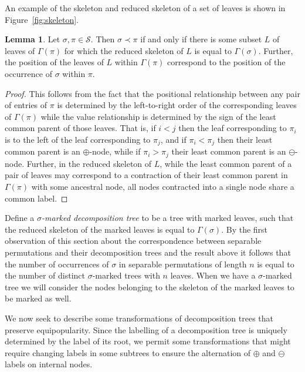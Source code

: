 \documentclass[10pt]{article}
\theoremstyle{definition}
\newtheorem{lemma}[theorem]{Lemma}
\numberwithin{equation}{section}
\numberwithin{figure}{section}
\begin{document}
An example of the skeleton and reduced skeleton of a set of leaves is shown in Figure~\ref{fig:skeleton}. 

\begin{lemma}
Let $\sigma, \pi \in \mathcal{S}$. Then $\sigma \prec \pi$ if and only if there is some subset $L$ of leaves of $\Gamma(\pi)$ for which the reduced skeleton of $L$ is equal to $\Gamma(\sigma)$. Further, the position of the leaves of $L$ within $\Gamma(\pi)$ correspond to the position of the occurrence of $\sigma$ within $\pi$. 
\end{lemma}

\begin{proof}
This follows from the fact that the positional relationship between any pair of entries of $\pi$ is determined by the left-to-right order of the corresponding leaves of $\Gamma(\pi)$ while the value relationship is determined by the sign of the least common parent of those leaves. That is, if $i < j$ then the leaf corresponding to $\pi_i$ is to the left of the leaf corresponding to $\pi_j$, and if $\pi_i < \pi_j$ then their least common parent is an $\oplus$-node, while if $\pi_i > \pi_j$ their least common parent is an $\ominus$-node. Further, in the reduced skeleton of $L$, while the least common parent of a pair of leaves may correspond to a contraction of their least common parent in $\Gamma(\pi)$ with some ancestral node, all nodes contracted into a single node share a common label.
\end{proof}

Define a \emph{$\sigma$-marked decomposition tree} to be a tree with marked leaves, such that the reduced skeleton of the marked leaves is equal to $\Gamma(\sigma)$. By the first observation of this section about the correspondence between separable permutations and their decomposition trees and the result above it follows that the number of occurrences of $\sigma$ in separable permutations of length $n$ is equal to the number of distinct $\sigma$-marked trees with $n$ leaves. When we have a $\sigma$-marked tree we will consider the nodes belonging to the skeleton of the marked leaves to be marked as well.

We now seek to describe some transformations of decomposition trees that preserve equipopularity. Since the labelling of a decomposition tree is uniquely determined by the label of its root, we permit some transformations that might require changing labels in some subtrees to ensure the alternation of $\oplus$ and $\ominus$ labels on internal nodes.
\end{document}
